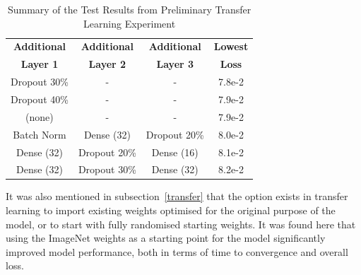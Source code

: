 \begin{table}[h!]
	\begin{center}
		
		\begin{tabular}{c|c|c|c} %
			\textbf{Additional} & \textbf{Additional} & \textbf{Additional} & \textbf{Lowest} \\
			
			\textbf{Layer 1} & \textbf{Layer 2} & \textbf{Layer 3} & \textbf{Loss} \\
			\hline
			Dropout 30\% & - & - & 7.8e-2  \\
			Dropout 40\% & - & - & 7.9e-2  \\ 
			(none) & - & - & 7.9e-2  \\
			Batch Norm & Dense (32) & Dropout 20\% & 8.0e-2  \\
			Dense (32) & Dropout 20\% & Dense (16) & 8.1e-2  \\
			Dense (32) & Dropout 30\% & Dense (32) & 8.2e-2  \\
		\end{tabular}
		\caption{Summary of the Test Results from Preliminary Transfer Learning Experiment}
		\label{tab:exp3}
	\end{center}
\end{table}

\noindent
It was also mentioned in subsection~\ref{transfer} that the option exists in transfer learning to import existing weights optimised for the original purpose of the model, or to start with fully randomised starting weights. It was found here that using the ImageNet weights as a starting point for the model significantly improved model performance, both in terms of time to convergence and overall loss.

